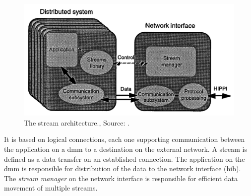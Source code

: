 \begin{figure}
    \centering
	\includegraphics[width=0.95\linewidth]{Figures/Rep4streamsarchitecture.png}
	\caption{The stream architecture., Source: \cite{steenkiste1997high}.}
    \label{fig:rep4:streams}
\end{figure}

It is based on logical connections, each one supporting communication between the application on a \ac{dmm} to a destination on the external network.
A stream is defined as a data transfer on an established connection.
The application on the \ac{dmm} is responsible for distribution of the data to the network interface (\ac{hib}).
The \textit{stream manager} on the network interface is responsible for efficient data movement of multiple streams.
